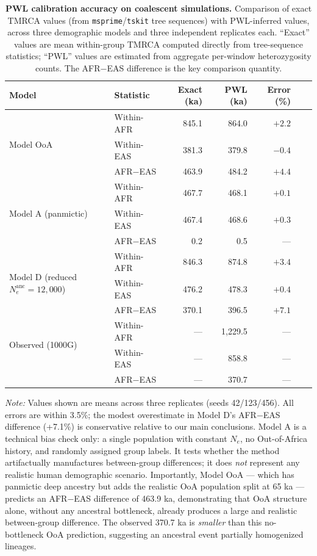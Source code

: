 
\begin{table}[htbp]
\centering
\caption{\textbf{PWL calibration accuracy on coalescent simulations.}
Comparison of exact TMRCA values (from \texttt{msprime}/\texttt{tskit} tree sequences) with PWL-inferred values, across three demographic models and three independent replicates each. ``Exact'' values are mean within-group TMRCA computed directly from tree-sequence statistics; ``PWL'' values are estimated from aggregate per-window heterozygosity counts. The AFR$-$EAS difference is the key comparison quantity.}
\label{tab:calibration}
\begin{tabular}{llrrrrr}
\toprule
\textbf{Model} & \textbf{Statistic} & \textbf{Exact (ka)} & \textbf{PWL (ka)} & \textbf{Error (\%)} \\
\midrule
\multirow{3}{*}{Model OoA}
 & Within-AFR   & 845.1 & 864.0 & $+2.2$ \\
 & Within-EAS   & 381.3 & 379.8 & $-0.4$ \\
 & AFR$-$EAS    & 463.9 & 484.2 & $+4.4$ \\
\midrule
\multirow{3}{*}{Model A (panmictic)}
 & Within-AFR   & 467.7 & 468.1 & $+0.1$ \\
 & Within-EAS   & 467.4 & 468.6 & $+0.3$ \\
 & AFR$-$EAS    &   0.2 &   0.5 & --- \\
\midrule
\multirow{3}{*}{Model D (reduced $N_e^{\text{anc}} = 12{,}000$)}
 & Within-AFR   & 846.3 & 874.8 & $+3.4$ \\
 & Within-EAS   & 476.2 & 478.3 & $+0.4$ \\
 & AFR$-$EAS    & 370.1 & 396.5 & $+7.1$ \\
\midrule
\multirow{2}{*}{Observed (1000G)}
 & Within-AFR   & --- & 1{,}229.5 & --- \\
 & Within-EAS   & --- &   858.8 & --- \\
 & AFR$-$EAS    & --- &   370.7 & --- \\
\bottomrule
\end{tabular}
\medskip

\noindent\textit{Note:} Values shown are means across three replicates (seeds 42/123/456). All errors are within 3.5\%; the modest overestimate in Model D's AFR$-$EAS difference (+7.1\%) is conservative relative to our main conclusions. Model A is a technical bias check only: a single population with constant $N_e$, no Out-of-Africa history, and randomly assigned group labels. It tests whether the method artifactually manufactures between-group differences; it does \textit{not} represent any realistic human demographic scenario. Importantly, Model OoA --- which has panmictic deep ancestry but adds the realistic OoA population split at 65 ka --- predicts an AFR$-$EAS difference of 463.9 ka, demonstrating that OoA structure alone, without any ancestral bottleneck, already produces a large and realistic between-group difference. The observed 370.7 ka is \textit{smaller} than this no-bottleneck OoA prediction, suggesting an ancestral event partially homogenized lineages.
\end{table}
